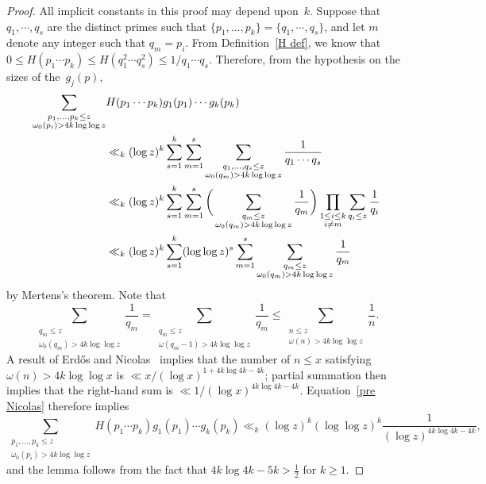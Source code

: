 \documentclass[12pt,reqno]{amsart}
\theoremstyle{definition}
\begin{document}
\begin{proof}
All implicit constants in this proof may depend upon~$k$.
Suppose that $q_1,\cdots,q_s$ are the distinct primes such that $\{p_1,\dots,p_k\} = \{q_1,\cdots,q_s\}$, and let $m$ denote any integer such that $q_m=p_i$.
From Definition~\ref{H def}, we know that $0\le H(p_1\cdots p_k) \le H(q_1^2\cdots q_s^2) \le 1/q_1\cdots q_s$. Therefore, from the hypothesis on the sizes of the~$g_j(p)$,
\begin{align}
\sum_{\substack{p_1,\dots,p_k \leq z \\ \omega_0(p_i) > 4k\log\log z}} & H(p_1\cdots p_k) g_1(p_1) \cdots g_k(p_k) \notag \\
&\ll_k (\log z)^k \sum_{s=1}^k \sum_{m=1}^s \sum_{\substack{q_1,\dots,q_s \leq z \\ \omega_0(q_m) > 4k\log\log z}} \frac1{q_1\cdots q_s} \notag \\
&\ll_k (\log z)^k \sum_{s=1}^k \sum_{m=1}^s \bigg( \sum_{\substack{q_m \le z \\ \omega_0(q_m) > 4k\log\log z}} \frac1{q_m} \bigg) \prod_{\substack{1\le i\le k \\ i\ne m}} \sum_{q_i\le z} \frac1{q_i} \notag \\
&\ll_k (\log z)^k \sum_{s=1}^k (\log\log z)^s \sum_{m=1}^s \sum_{\substack{q_m \le z \\ \omega_0(q_m) > 4k\log\log z}} \frac1{q_m}  \label{pre Nicolas}
\end{align}
by Mertens's theorem. Note that
\[
\sum_{\substack{q_m \le z \\ \omega_0(q_m) > 4k\log\log z}} \frac1{q_m} = \sum_{\substack{q_m \le z \\ \omega(q_m-1) > 4k\log\log z}} \frac1{q_m} \le \sum_{\substack{n \le z \\ \omega(n) > 4k\log\log z}} \frac1n.
\]
A result of Erd{\H o}s and Nicolas~\cite{Erd1978-1979} implies that the number of $n \leq x$ satisfying $\omega(n) > 4k \log\log x$ is $\ll {x}/{(\log x)^{1 + 4k\log4k - 4k}}$; partial summation then implies that the right-hand sum is $\ll 1/(\log x)^{4k\log4k - 4k}$. Equation~\eqref{pre Nicolas} therefore implies
\[
\sum_{\substack{p_1,\dots,p_k \leq z \\ \omega_0(p_i) > 4k\log\log z}} H(p_1\cdots p_k) g_1(p_1) \cdots g_k(p_k) \ll_k (\log z)^k (\log\log z)^k \frac1{(\log z)^{4k\log 4k-4k}},
\]
and the lemma follows from the fact that $4k\log4k-5k>\frac12$ for $k\ge1$.
\end{proof}
\end{document}
